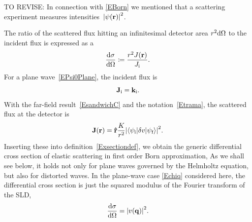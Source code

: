 TO REVISE: In connection with \cref{EBorn} we mentioned
that a scattering experiment measures intensities~${|\psi(\mathbf{r})|}^2$.

%
The ratio of the scattered flux hitting an infinitesimal detector area
$r^2\mathrm d\Omega$ to the incident flux is expressed as a
%
%
%
\begin{equation}\label{Exsectiondef}
  \frac{\mathrm d\sigma}{\mathrm d\Omega}
  \coloneqq  \frac{r^2 J(\mathbf{r})}{J_{\text{i}}}.
\end{equation}
%
%
For a plane wave~\cref{EPsi0Plane}, the incident flux is
%
%
\begin{equation}\label{EJi}
  \mathbf{J}_{\text{i}} = \mathbf{k}_{\text{i}}.
\end{equation}
With the far-field result~\cref{EsandwichC}
and the notation~\cref{Etrama},
the scattered flux at the detector is
\begin{equation}\label{EJr}
  \mathbf{J}(\mathbf{r})
  = \mathbf{\hat r}\frac{K}{r^2}
    {\left|\braket{\psi_{\text{i}}|\delta v|\psi_{\text{f}}}\right|}^2.
\end{equation}
%
Inserting these into definition~\cref{Exsectiondef},
we obtain the generic differential cross section
of elastic scattering in first order Born approximation,
%
%
%
As we shall see below,
it holds not only for plane waves governed
by the Helmholtz equation,
but also for distorted waves.
%
In the plane-wave case \cref{Echiq} considered here,
the differential cross section is just the squared modulus
of the Fourier transform of the SLD,
%
\begin{equation}\label{Ecross1}
  \frac{\mathrm d\sigma}{\mathrm d\Omega}
  = {\left| v(\mathbf{q}) \right|}^2.
\end{equation}

